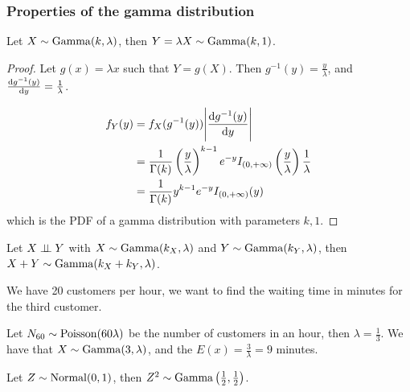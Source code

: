 \documentclass[12pt]{extarticle}
\newcommand{\Normal}{{\operatorfont Normal}}
\newcommand{\GammaD}{{\operatorfont Gamma}}
\newcommand{\Poisson}{{\operatorfont Poisson}}
\begin{document}
\subsubsection{Properties of the gamma distribution}

\begin{theorem}
    Let $X \sim \GammaD(k, \lambda)$, then $Y = \lambda X \sim \GammaD(k, 1)$.
\end{theorem}

\begin{proof}
    Let $g(x) = \lambda x$ such that $Y = g(X)$.
    Then $g^{-1}(y) = \frac{y}{\lambda}$, and $\dv{g^{-1}(y)}{y} = \frac{1}{\lambda}$.

    \begin{align}
        f_Y(y) & = f_X(g^{-1}(y)) \abs{\dv{g^{-1}(y)}{y}}                                                                                           \\
               & = \frac{1}{\Gamma(k)} \left(\frac{y}{\lambda}\right)^{k-1} e^{-y} I_{(0, +\infty)}\left(\frac{y}{\lambda}\right) \frac{1}{\lambda} \\
               & = \frac{1}{\Gamma(k)} y^{k-1} e^{-y} I_{(0, +\infty)}(y)                                                                           \\
    \end{align}
    which is the PDF of a gamma distribution with parameters $k, 1$.
\end{proof}

\begin{theorem}
    Let $X \perp \!\!\! \perp Y$ with $X \sim \GammaD(k_X, \lambda)$ and $Y \sim \GammaD(k_Y, \lambda)$, then $X + Y \sim \GammaD(k_X + k_Y, \lambda)$.
\end{theorem}

\begin{example}
    We have 20 customers per hour, we want to find the waiting time in minutes for the third customer.

    Let $N_{60} \sim \Poisson(60\lambda)$ be the number of customers in an hour, then $\lambda = \frac{1}{3}$.
    We have that $X \sim \GammaD(3, \lambda)$, and the $E(x) = \frac{3}{\lambda} = 9$ minutes.
\end{example}

\begin{theorem}
    Let $Z \sim \Normal(0, 1)$, then $Z^2 \sim \GammaD\left(\frac{1}{2}, \frac{1}{2}\right)$.
\end{theorem}
\end{document}
